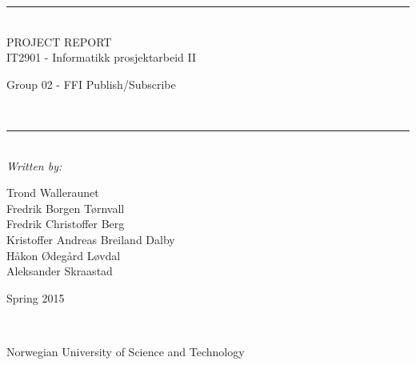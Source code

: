\thispagestyle{empty}
\begin{center}
\noindent\rule{\textwidth}{0.5pt}
\\[1pc]
\Huge{PROJECT REPORT}
\\[1pc]
\large{IT2901 - Informatikk prosjektarbeid II}
\\[1pc]
\begin{small}
\begin{bf}Group 02 - FFI Publish/Subscribe\end{bf}
\end{small}
\\[1pc]
\noindent\rule{\textwidth}{0.5pt}
\\[5pc]
\textit{Written by:}
\\[1pc]
\begin{small}
Trond Walleraunet\\Fredrik Borgen Tørnvall\\Fredrik Christoffer Berg\\Kristoffer Andreas Breiland Dalby\\Håkon Ødegård Løvdal\\Aleksander Skraastad \\[7pc]
\end{small}
\begin{bf}
Spring 2015
\end{bf}
\\[8pc]

\noindent{}

\begin{small}Norwegian University of Science and Technology\end{small}

\end{center}

\pagebreak